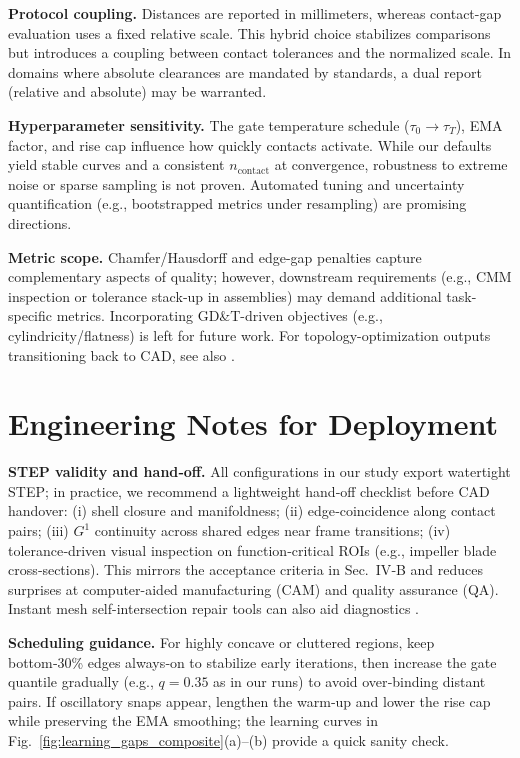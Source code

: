 \documentclass{ieeeaccess}
\begin{document}
\textbf{Protocol coupling.} Distances are reported in millimeters, whereas
contact-gap evaluation uses a fixed relative scale. This hybrid choice
stabilizes comparisons but introduces a coupling between contact
tolerances and the normalized scale. In domains where absolute
clearances are mandated by standards, a dual report (relative and
absolute) may be warranted. 

\textbf{Hyperparameter sensitivity.} The gate temperature schedule
($\tau_0\!\to\!\tau_T$), EMA factor, and rise cap influence how quickly
contacts activate. While our defaults yield stable curves and a consistent
$n_{\text{contact}}$ at convergence, robustness to extreme noise or sparse
sampling is not proven. Automated tuning and uncertainty quantification
(e.g., bootstrapped metrics under resampling) are promising directions. 

\textbf{Metric scope.} Chamfer/Hausdorff and edge-gap penalties capture
complementary aspects of quality; however, downstream requirements
(e.g., CMM inspection or tolerance stack‑up in assemblies) may demand
additional task-specific metrics. Incorporating GD\&T-driven objectives
(e.g., cylindricity/flatness) is left for future work. For topology-optimization outputs transitioning back to CAD, see also \cite{b26}.

\section{Engineering Notes for Deployment}
\label{sec:engnotes}

\textbf{STEP validity and hand‑off.} All configurations in our study export
watertight STEP; in practice, we recommend a lightweight hand‑off
checklist before CAD handover: (i) shell closure and manifoldness; (ii)
edge‑coincidence along contact pairs; (iii) $G^1$ continuity across shared
edges near frame transitions; (iv) tolerance‑driven visual inspection on
function‑critical ROIs (e.g., impeller blade cross‑sections). This mirrors
the acceptance criteria in Sec.~IV‑B and reduces surprises at computer-aided manufacturing (CAM) and quality assurance (QA). Instant mesh self-intersection repair tools can also aid diagnostics \cite{b12}.


\textbf{Scheduling guidance.} For highly concave or cluttered regions,
keep bottom‑30\% edges always‑on to stabilize early iterations, then
increase the gate quantile gradually (e.g., $q\!=\!0.35$ as in our runs) to
avoid over‑binding distant pairs. If oscillatory snaps appear, lengthen the
warm‑up and lower the rise cap while preserving the EMA smoothing;
the learning curves in Fig.~\ref{fig:learning_gaps_composite}(a)–(b) provide a quick sanity
check. 
\end{document}
